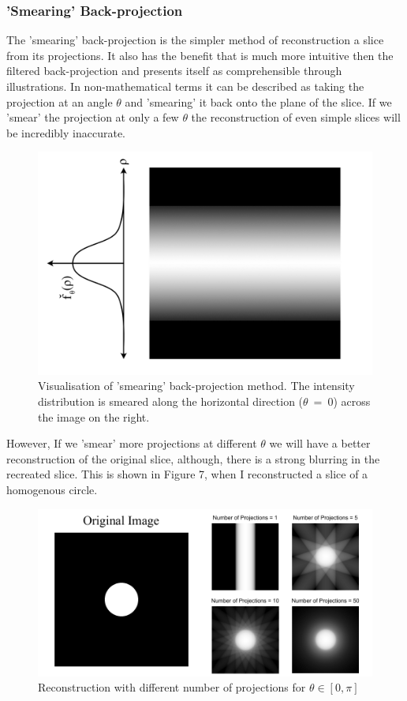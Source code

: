 \documentclass[12pt]{article}
\begin{document}
\subsubsection{'Smearing' Back-projection}
The 'smearing' back-projection is the simpler method of reconstruction a slice from its projections. It also has the benefit that is much more intuitive then the filtered back-projection and presents itself as comprehensible through illustrations. In non-mathematical terms it can be described as taking the projection at an angle $\theta$ and 'smearing' it back onto the plane of the slice. If we 'smear' the projection at only a few $\theta$ the reconstruction of even simple slices will be incredibly inaccurate. 
\begin{figure}[hbt]
	\includegraphics[width = .5\textwidth ]{inverse_radon/backprojection_smearing}
	\caption{Visualisation of 'smearing' back-projection method. The intensity distribution is smeared along the horizontal direction ($\theta~=~0$) across the image on the right.}
\end{figure}
However, If we 'smear' more projections at different $\theta$ we will have a better reconstruction of the original slice, although, there is a strong blurring in the recreated slice. This is shown in Figure 7, when I reconstructed a slice of a homogenous circle.  
\begin{figure}[hbt]
	\includegraphics[width = \textwidth]{inverse_radon/smearing}
	\caption{Reconstruction with different number of projections for $\theta \in [0, \pi]$}
\end{figure}
\end{document}

